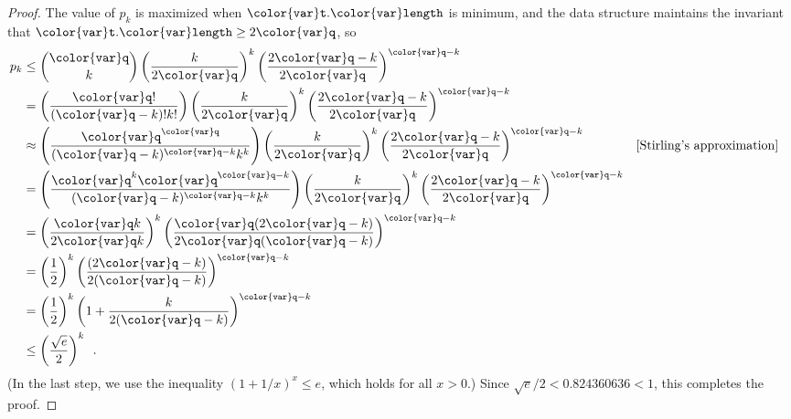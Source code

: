 \documentclass[10pt]{book}
\theoremstyle{plain}
\theoremstyle{definition}
\begin{document}
\begin{proof}
The value of $p_k$ is maximized when \ensuremath{\mathtt{{\color{var}t}.{\color{var}length}}} is minimum, and the data
structure maintains the invariant that $\ensuremath{\mathtt{{\color{var}t}.{\color{var}length}}} \ge 2\ensuremath{\mathtt{{\color{var}q}}}$, so
\begin{align*}
   p_k & \le \binom{\ensuremath{\mathtt{{\color{var}q}}}}{k}\left(\frac{k}{2\ensuremath{\mathtt{{\color{var}q}}}}\right)^k\left(\frac{2\ensuremath{\mathtt{{\color{var}q}}}-k}{2\ensuremath{\mathtt{{\color{var}q}}}}\right)^{\ensuremath{\mathtt{{\color{var}q}}}-k} \\
  & = \left(\frac{\ensuremath{\mathtt{{\color{var}q}}}!}{(\ensuremath{\mathtt{{\color{var}q}}}-k)!k!}\right)\left(\frac{k}{2\ensuremath{\mathtt{{\color{var}q}}}}\right)^k\left(\frac{2\ensuremath{\mathtt{{\color{var}q}}}-k}{2\ensuremath{\mathtt{{\color{var}q}}}}\right)^{\ensuremath{\mathtt{{\color{var}q}}}-k} \\
  & \approx \left(\frac{\ensuremath{\mathtt{{\color{var}q}}}^{\ensuremath{\mathtt{{\color{var}q}}}}}{(\ensuremath{\mathtt{{\color{var}q}}}-k)^{\ensuremath{\mathtt{{\color{var}q}}}-k}k^k}\right)\left(\frac{k}{2\ensuremath{\mathtt{{\color{var}q}}}}\right)^k\left(\frac{2\ensuremath{\mathtt{{\color{var}q}}}-k}{2\ensuremath{\mathtt{{\color{var}q}}}}\right)^{\ensuremath{\mathtt{{\color{var}q}}}-k} && \text{[Stirling's approximation]} \\
  & = \left(\frac{\ensuremath{\mathtt{{\color{var}q}}}^{k}\ensuremath{\mathtt{{\color{var}q}}}^{\ensuremath{\mathtt{{\color{var}q}}}-k}}{(\ensuremath{\mathtt{{\color{var}q}}}-k)^{\ensuremath{\mathtt{{\color{var}q}}}-k}k^k}\right)\left(\frac{k}{2\ensuremath{\mathtt{{\color{var}q}}}}\right)^k\left(\frac{2\ensuremath{\mathtt{{\color{var}q}}}-k}{2\ensuremath{\mathtt{{\color{var}q}}}}\right)^{\ensuremath{\mathtt{{\color{var}q}}}-k} \\
 & = \left(\frac{\ensuremath{\mathtt{{\color{var}q}}}k}{2\ensuremath{\mathtt{{\color{var}q}}}k}\right)^k
     \left(\frac{\ensuremath{\mathtt{{\color{var}q}}}(2\ensuremath{\mathtt{{\color{var}q}}}-k)}{2\ensuremath{\mathtt{{\color{var}q}}}(\ensuremath{\mathtt{{\color{var}q}}}-k)}\right)^{\ensuremath{\mathtt{{\color{var}q}}}-k} \\
 & = \left(\frac{1}{2}\right)^k
     \left(\frac{(2\ensuremath{\mathtt{{\color{var}q}}}-k)}{2(\ensuremath{\mathtt{{\color{var}q}}}-k)}\right)^{\ensuremath{\mathtt{{\color{var}q}}}-k} \\
 & = \left(\frac{1}{2}\right)^k
     \left(1+\frac{k}{2(\ensuremath{\mathtt{{\color{var}q}}}-k)}\right)^{\ensuremath{\mathtt{{\color{var}q}}}-k} \\
 & \le \left(\frac{\sqrt{e}}{2}\right)^k \enspace .
\end{align*}
(In the last step, we use the inequality $(1+1/x)^x \le e$, which holds
for all $x>0$.)  Since $\sqrt{e}/{2}< 0.824360636 < 1$, this completes
the proof.
\end{proof}
\end{document}
